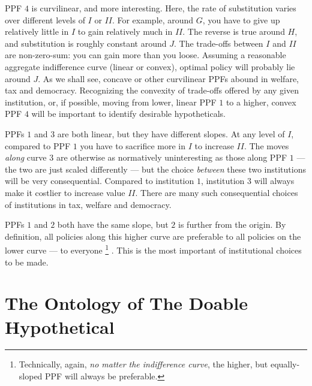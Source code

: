 	\gls{PPF} $4$ is curvilinear, and more interesting.
	Here, the rate of substitution varies over different levels of $I$ or $II$.
	For example, around $G$, you have to give up relatively little in $I$ to gain relatively much in $II$.
	The reverse is true around $H$, and substitution is roughly constant around $J$.
	The trade-offs between $I$ and $II$ are non-zero-sum: you can gain more than you loose.
	Assuming a reasonable aggregate indifference curve (linear or convex), optimal policy will probably lie around $J$.
	As we shall see, concave or other curvilinear \glspl{PPF} abound in welfare, tax and democracy.
	Recognizing the convexity of trade-offs offered by any given institution, or, if possible, moving from lower, linear \gls{PPF} $1$ to a higher, convex \gls{PPF} $4$ will be important to identify desirable hypotheticals.%

	\glspl{PPF} $1$ and $3$ are both linear, but they have different slopes.
	At any level of $I$, compared to \gls{PPF} $1$ you have to sacrifice more in $I$ to increase $II$.
	The moves \emph{along} curve $3$ are otherwise as normatively uninteresting as those along \gls{PPF} $1$ --- the two are just scaled differently --- but the choice \emph{between} these two institutions will be very consequential.
	Compared to institution $1$, institution $3$ will always make it costlier to increase value $II$.
	There are many such consequential choices of institutions in tax, welfare and democracy. %

	\glspl{PPF} $1$ and $2$ both have the same slope, but $2$ is further from the origin.
	By definition, all policies along this higher curve are preferable to all policies on the lower curve --- to everyone
	\footnote{
		Technically, again, \emph{no matter the indifference curve}, the higher, but equally-sloped \gls{PPF} will always be preferable.
	}
	.
	This is the most important of institutional choices to be made.




\section[Ontology]{The Ontology of The Doable Hypothetical} \label{sec:ontology}

